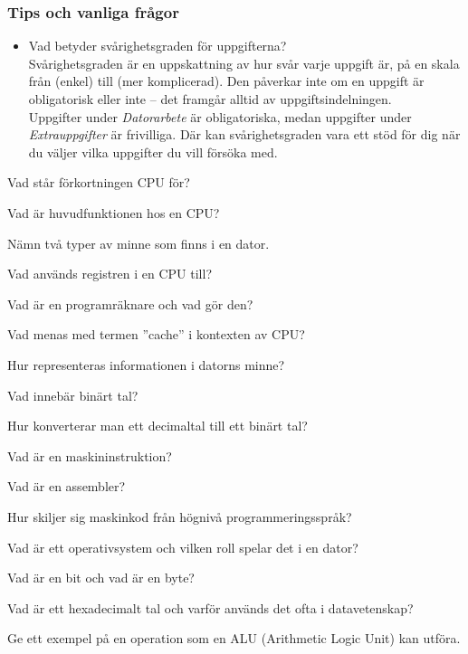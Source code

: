 \subsubsection{Tips och vanliga frågor}
\begin{itemize}[nosep]
    \item Vad betyder svårighetsgraden för uppgifterna?\\
          Svårighetsgraden är en uppskattning av hur svår varje uppgift är, på en skala från  (enkel) till  (mer komplicerad). Den påverkar inte om en uppgift är obligatorisk eller inte -- det framgår alltid av uppgiftsindelningen. \\
          Uppgifter under \emph{Datorarbete} är obligatoriska, medan uppgifter under \emph{Extrauppgifter} är frivilliga. Där kan svårighetsgraden vara ett stöd för dig när du väljer vilka uppgifter du vill försöka med.

\end{itemize}

\begin{Kontrollfragor}
    \item Vad står förkortningen CPU för?
    \item Vad är huvudfunktionen hos en CPU?
    \item Nämn två typer av minne som finns i en dator.
    \item Vad används registren i en CPU till?
    \item Vad är en programräknare och vad gör den?
    \item Vad menas med termen ''cache'' i kontexten av CPU?
    \item Hur representeras informationen i datorns minne?
    \item Vad innebär binärt tal?
    \item Hur konverterar man ett decimaltal till ett binärt tal?
    \item Vad är en maskininstruktion?
    \item Vad är en assembler?
    \item Hur skiljer sig maskinkod från högnivå programmeringsspråk?
    \item Vad är ett operativsystem och vilken roll spelar det i en dator?
    \item Vad är en bit och vad är en byte?
    \item Vad är ett hexadecimalt tal och varför används det ofta i datavetenskap?
    \item Ge ett exempel på en operation som en ALU (Arithmetic Logic Unit) kan utföra.

\end{Kontrollfragor} 

